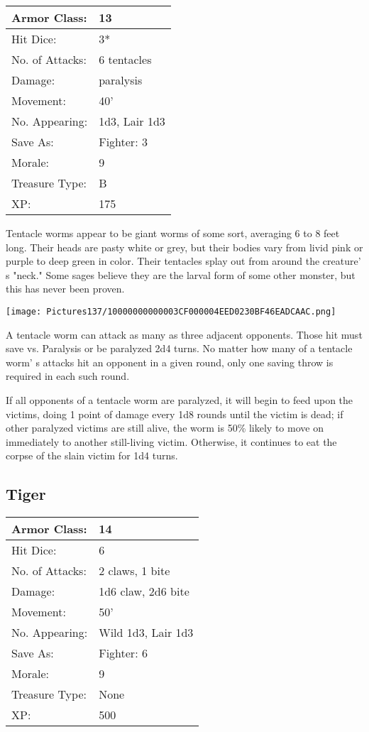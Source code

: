 \documentclass[a4paper,twoside,openany,10pt]{book}
\begin{document}
\begin{multicols}{2}
\begin{tabularx}{0.50\textwidth}{@{}lX@{}}
Armor Class: & 13 \\\hline
Hit Dice: & 3* \\\hline
No. of Attacks: & 6 tentacles \\\hline
Damage: & paralysis \\\hline
Movement: & 40' \\\hline
No. Appearing: & 1d3, Lair 1d3 \\\hline
Save As: & Fighter: 3 \\\hline
Morale: & 9 \\\hline
Treasure Type: & B \\\hline
XP: & 175 \\\hline
\end{tabularx}\medskip

Tentacle worms appear to be giant worms of some sort, averaging 6 to 8 feet long. Their heads are pasty white or grey, but their bodies vary from livid pink or purple to deep green in color. Their tentacles splay out from around the creature' s "neck." Some sages believe they are the larval form of some other monster, but this has never been proven.\medskip

\texttt{[image: Pictures137/10000000000003CF000004EED0230BF46EADCAAC.png]}

A tentacle worm can attack as many as three adjacent opponents. Those hit must save vs. Paralysis or be paralyzed 2d4 turns. No matter how many of a tentacle worm' s attacks hit an opponent in a given round, only one saving throw is required in each such round.

If all opponents of a tentacle worm are paralyzed, it will begin to feed upon the victims, doing 1 point of damage every 1d8 rounds until the victim is dead; if other paralyzed victims are still alive, the worm is 50\% likely to move on immediately to another still-living victim. Otherwise, it continues to eat the corpse of the slain victim for 1d4 turns.

\subsection*{Tiger}\label{tiger}

\begin{tabularx}{0.50\textwidth}{@{}lX@{}}
Armor Class: & 14 \\\hline
Hit Dice: & 6 \\\hline
No. of Attacks: & 2 claws, 1 bite \\\hline
Damage: & 1d6 claw, 2d6 bite \\\hline
Movement: & 50' \\\hline
No. Appearing: & Wild 1d3, Lair 1d3 \\\hline
Save As: & Fighter: 6 \\\hline
Morale: & 9 \\\hline
Treasure Type: & None \\\hline
XP: & 500 \\\hline
\end{tabularx}\medskip



\end{multicols}
\end{document}
